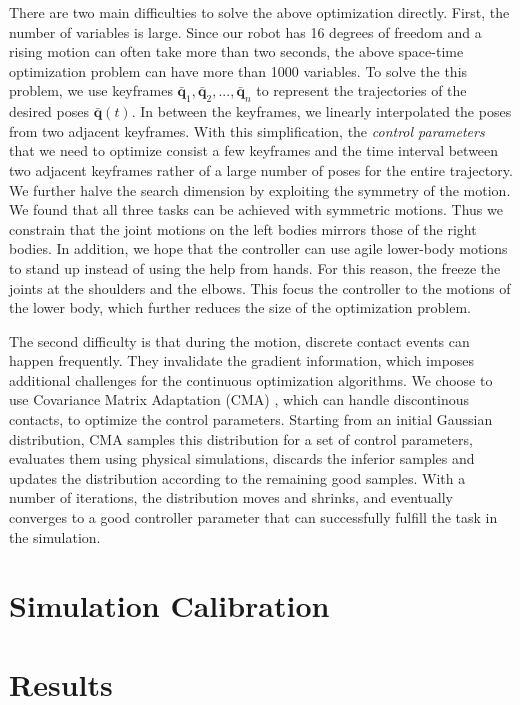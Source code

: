 There are two main difficulties to solve the above optimization directly. First, the number of variables is large. Since our robot has 16 degrees of freedom and a rising motion can often take more than two seconds, the above space-time optimization problem can have more than 1000 variables. To solve the this problem, we use keyframes $\bar{\mathbf{q}}_1, \bar{\mathbf{q}}_2, ..., \bar{\mathbf{q}}_n$ to represent the trajectories of the desired poses $\bar{\mathbf{q}}(t)$. In between the keyframes, we linearly interpolated the poses from two adjacent keyframes. With this simplification, the \emph{control parameters} that we need to optimize consist a few keyframes and the time interval between two adjacent keyframes rather of a large number of poses for the entire trajectory. We further halve the search dimension by exploiting the symmetry of the motion. We found that all three tasks can be achieved with symmetric motions. Thus we constrain that the joint motions on the left bodies mirrors those of the right bodies. In addition, we hope that the controller can use agile lower-body motions to stand up instead of using the help from hands. For this reason, the freeze the joints at the shoulders and the elbows. This focus the controller to the motions of the lower body, which further reduces the size of the optimization problem.

The second difficulty is that during the motion, discrete contact events can happen frequently. They invalidate the gradient information, which imposes additional challenges for the continuous optimization algorithms. We choose to use Covariance Matrix Adaptation (CMA) \cite{Hansen:2009}, which can handle discontinous contacts, to optimize the control parameters. Starting from an initial Gaussian distribution, CMA samples this distribution for a set of control parameters, evaluates them using physical simulations, discards the inferior samples and updates the distribution according to the remaining good samples. With a number of iterations, the distribution moves and shrinks, and eventually converges to a good controller parameter that can successfully fulfill the task in the simulation.

\section{Simulation Calibration}
\section{Results}

